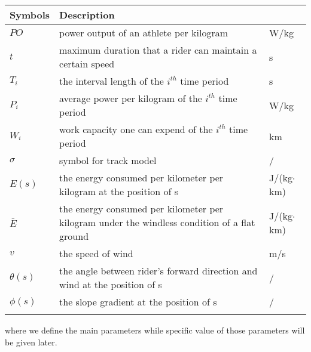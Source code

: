 \begin{center}
	\begin{tabular}{p{1.5cm}<{\centering}p{11.5cm}<{\centering}p{2.5cm}<{\centering}}
		\toprule[2pt]
		{\bf Symbols} & {\bf Description} & \quad {\bf Unit} \\\midrule[1pt]
		$PO$ & power output of an athlete per kilogram  & \quad W/kg 
		\\[0.2cm]
		$t$ & maximum duration that a rider can maintain a certain speed  & \quad s \\[0.2cm]
		$T_i$ & the interval length of the $i^{th}$ time period &\quad s\\ [0.2cm]
		$P_i$ & average power per kilogram of the $i^{th}$ time period & \quad W/kg \\[0.2cm]
		$W_i$& work capacity one can expend of the $i^{th}$ time period & \quad km\\[0.2cm]
        $\sigma$& symbol for track model & \quad /\\
       	$E(s)$& the energy consumed per kilometer per kilogram at the position of s& \quad J/(kg$\cdot$km)\\[0.2cm]
		$\bar{E}$ &the energy consumed per kilometer per kilogram under the windless condition of a flat ground  & \quad J/(kg$\cdot$km)\\[0.2cm]
		
        $v$ & the speed of wind & \quad m/s\\[0.2cm]
        
        $\theta(s)$ &the angle between rider's forward direction and wind at the position of s & \quad /\\[0.2cm]
        $\phi(s)$& the slope gradient at the position of s&\quad /\\[0.2cm]
	\bottomrule[2pt]\\
	\end{tabular}
\end{center}
\noindent where we define the main parameters while specific value of those parameters will be given later.
